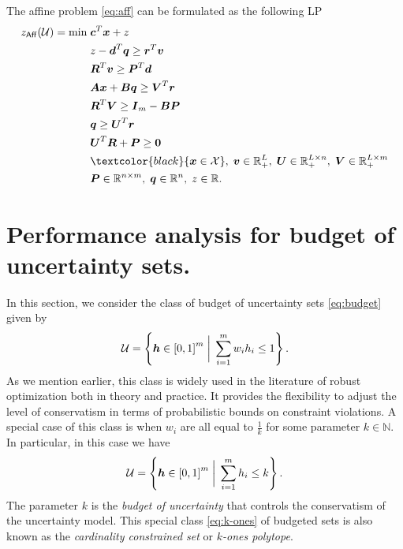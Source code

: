 \documentclass[moor]{informs1}              %
\newcommand{\mb}[1]{\ensuremath{\boldsymbol{#1}}}
\newcommand*{\red}{\textcolor{black}}
\begin{document}
\begin{lemma} \label{lem:LP-form}
The affine problem \eqref{eq:aff} can be formulated as the following LP
\begin{equation}\label{eq:aff:LP}
\begin{aligned}
z_{\sf Aff}({\cal  U}) =  \min \; &  \mb{c}^T \mb{x} + z \\
& z- \mb d^T \mb q \geq \mb r^T \mb v \\
& \mb R^T \mb v \geq \mb P^T \mb d \\
& \mb A \mb x + \mb B \mb q \geq \mb V^T \mb r\\
& \mb R^T \mb V \geq \mb I_m - \mb B \mb P \\
& \mb q \geq \mb U^T \mb r \\
& \mb U^T \mb R + \mb P \geq \mb 0 \\
& \red{\mb{x}  \in  {\cal X} }, \; \mb{v}   \in  {\mathbb R}^{L}_+, \; \mb{U}   \in  {\mathbb R}^{L \times n}_+, \; \mb{V}   \in  {\mathbb R}^{L \times m}_+ \\
&  \mb P \in \mathbb{R}^{n \times m}, \; \mb q \in \mathbb{R}^n, \; z \in \mathbb{R}.   \\
\end{aligned}
\end{equation}
\end{lemma}




\section{Performance analysis for budget of uncertainty sets.}

In this section, we consider the class of budget of uncertainty sets \eqref{eq:budget} given by 
\begin{equation*}
{\cal U}= \left\{ \mb h \in {[ 0, 1]}^m \; \bigg\vert \; \sum _{i=1}^m w_i  h_i  \leq  1 \right\}.
\end{equation*}
As we mention earlier, this class  is widely used in the literature of robust optimization both in theory and practice. It provides the flexibility to adjust the level of conservatism in terms of probabilistic bounds on constraint violations. A special case of this class is when  $w_i$ are all equal to $\frac{1}{k}$ for  some  parameter $k \in \mathbb{N}$. In particular, in this case we have
\begin{equation} \label{eq:k-ones}
{\cal U}= \left\{ \mb h \in {[ 0, 1]}^m \; \bigg\vert \; \sum _{i=1}^m  h_i  \leq  k \right\}.
\end{equation}
The parameter $k$ is the {\em budget of uncertainty} that controls the conservatism of the uncertainty model. This special class \eqref{eq:k-ones} of budgeted sets is also known as the {\em cardinality constrained set} or  {\em $k$-ones polytope}. 
\end{document}
